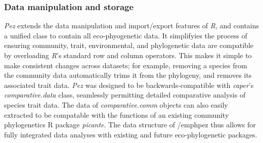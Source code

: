 \documentclass[11pt]{article} %
\begin{document}
\subsubsection*{Data manipulation and storage}
\emph{Pez} extends the data manipulation and import/export features of
\emph{R}, and contains a unified class to contain all eco-phyogenetic
data. It simplifyies the process of ensuring community, trait,
environmental, and phylogenetic data are compatible by overloading
\emph{R}'s standard row and column operators. This makes it simple to
make consistent changes across datasets; for example, removing a
species from the community data automatically trims it from the
phylogeny, and removes its associated trait data. \emph{Pez} was
designed to be backwards-compatible with \emph{caper}'s
\autocite{Orme2013} \emph{comparative.data} class, seamlessly permitting detailed
comparative analysis of species trait data. The data of \emph{comparative.comm} objects 
can also easily extracted to be compatable with the functions of an existing community phylogenetics R package \emph{picante}. The data structure of /emph{pez} thus allows for fully integrated data analyses with existing 
and future eco-phylogenetic packages.   
\end{document}
